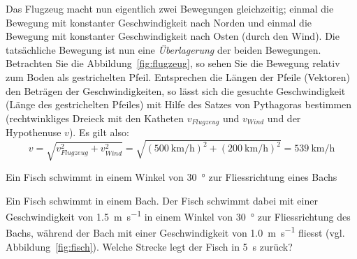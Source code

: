 \begin{solution}
Das Flugzeug macht nun eigentlich zwei Bewegungen gleichzeitig; einmal die Bewegung mit konstanter Geschwindigkeit nach Norden und einmal die Bewegung mit konstanter Geschwindigkeit nach Osten (durch den Wind). Die tatsächliche Bewegung ist nun eine \textit{Überlagerung} der beiden Bewegungen. Betrachten Sie die Abbildung~\ref{fig:flugzeug}, so sehen Sie die Bewegung relativ zum Boden als gestrichelten Pfeil. Entsprechen die Längen der Pfeile (Vektoren) den Beträgen der Geschwindigkeiten, so lässt sich die gesuchte Geschwindigkeit (Länge des gestrichelten Pfeiles) mit Hilfe des Satzes von Pythagoras bestimmen (rechtwinkliges Dreieck mit den Katheten $v_{Flugzeug}$ und $v_{Wind}$ und der Hypothenuse $v$). Es gilt also:
\[ v = \sqrt{v_{Flugzeug}^{2} + v_{Wind}^{2}} = \sqrt{(\SI{500}{\kilo \metre \per \hour})^2 + (\SI{200}{\kilo \metre \per \hour})^2} = \SI{539}{\kilo \metre \per \hour}\]
\end{solution}

\begin{marginfigure} \center
    \caption{Ein Fisch schwimmt in einem Winkel von \SI{30}{\degree} zur Fliessrichtung eines Bachs}
    \label{fig:fisch}
\end{marginfigure}

\begin{example}
Ein Fisch schwimmt in einem Bach. Der Fisch schwimmt dabei mit einer Geschwindigkeit von \SI{1.5}{\metre \per \second} in einem Winkel von \SI{30}{\degree} zur Fliessrichtung des Bachs, während der Bach mit einer Geschwindigkeit von \SI{1.0}{\metre \per \second} fliesst (vgl. Abbildung~\ref{fig:fisch}). Welche Strecke legt der Fisch in \SI{5}{\second} zurück?
\end{example}

